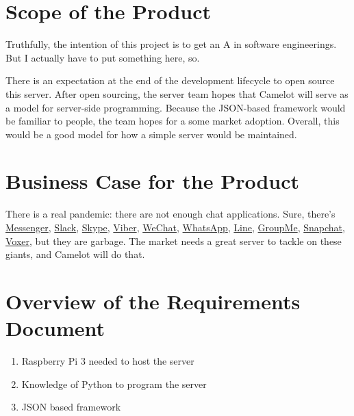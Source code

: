 \section{Scope of the Product}\label{scope-of-the-product}
Truthfully, the intention of this project is to get an A in software
engineerings. But I actually have to put something here, so.

There is an expectation at the end of the development lifecycle to open
source this server. After open sourcing, the server team hopes that
Camelot will serve as a model for server-side programming. Because the
JSON-based framework would be familiar to people, the team hopes for a
some market adoption. Overall, this would be a good model for how a
simple server would be maintained.

\section{Business Case for the Product}\label{business-case-for-the-product}
There is a real pandemic: there are not enough chat applications. Sure,
there's
\href{https://www.messenger.com}{Messenger},
\href{https://slack.com/}{Slack},
\href{https://www.skype.com/en/}{Skype},
\href{https://www.viber.com/en/}{Viber},
\href{https://web.wechat.com}{WeChat},
\href{https://www.whatsapp.com}{WhatsApp},
\href{https://line.me/en/}{Line},
\href{https://web.groupme.com}{GroupMe},
\href{https://www.snapchat.com}{Snapchat},
\href{http://voxer.com}{Voxer},
but they are garbage. The market needs a
great server to tackle on these giants, and Camelot will do that.

\section{Overview of the Requirements
Document}\label{overview-of-the-requirements-document}
\begin{enumerate}
    \item Raspberry Pi 3 needed to host the server
    \item Knowledge of Python to program the server
    \item JSON based framework
\end{enumerate}
